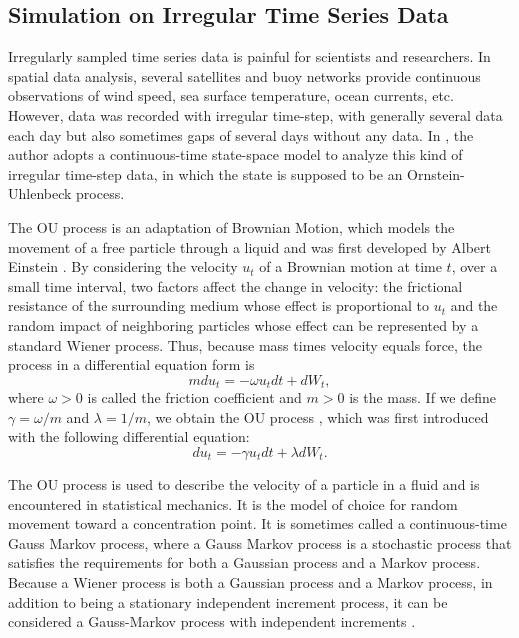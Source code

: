 \subsection{Simulation on Irregular Time Series Data}

Irregularly sampled time series data is painful for scientists and researchers. In spatial data analysis, several satellites and buoy networks provide continuous observations of wind speed, sea surface temperature, ocean currents, etc. However, data was recorded with irregular time-step, with generally several data each day but also sometimes gaps of several days without any data. In \cite{tandeo2011linear}, the author adopts a continuous-time state-space model to analyze this kind of irregular time-step data, in which the state is supposed to be an Ornstein-Uhlenbeck process. 

The OU process is an adaptation of Brownian Motion, which models the movement of a free particle through a liquid and was first developed by Albert Einstein \cite{einstein1956investigations}. 
By considering the velocity $u_t$ of a Brownian motion at time $t$, over a small time interval, two factors affect the change in velocity: the frictional resistance of the surrounding medium whose effect is proportional to $u_t$ and the random impact of neighboring particles whose effect can be represented by a standard Wiener process. Thus, because mass times velocity equals force, the process in a differential equation form is 
\begin{equation*}
mdu_t = -\omega u_tdt+dW_t,
\end{equation*}
where $\omega>0$ is called the friction coefficient and $m>0$ is the mass. If we define $\gamma = \omega /m$ and $\lambda = 1/m$, we obtain the OU process \cite{vaughan2015goodness}, which was first introduced with the following differential equation:
\begin{equation*}
du_t= -\gamma u_tdt+\lambda dW_t.
\end{equation*}


The OU process is used to describe the velocity of a particle in a fluid and is encountered in statistical mechanics. It is the model of choice for random movement toward a concentration point. It is sometimes called a continuous-time Gauss Markov process, where a Gauss Markov process is a stochastic process that satisfies the requirements for both a Gaussian process and a Markov process. Because a Wiener process is both a Gaussian process and a Markov process, in addition to being a stationary independent increment process, it can be considered a Gauss-Markov process with independent increments \cite{kijima1997markov}. 

